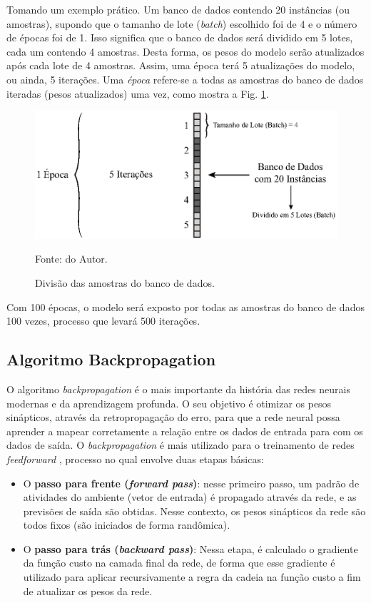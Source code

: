 Tomando um exemplo prático. Um banco de dados contendo 20 instâncias (ou amostras), supondo que o tamanho de lote (\textit{batch}) escolhido foi de 4 e o número de épocas foi de 1. Isso significa que o banco de dados será dividido em 5 lotes, cada um contendo 4 amostras. Desta forma, os pesos do modelo serão atualizados após cada lote de 4 amostras. Assim, uma época terá 5 atualizações do modelo, ou ainda, 5 iterações. Uma \textit{época} refere-se a todas as amostras do banco de dados iteradas (pesos atualizados) uma vez, como mostra a Fig. \ref{fig: BatchEpoch}.

\begin{figure}[H]
    \centering
    \includegraphics{04-Figuras/BatchEpoch.eps}
    \caption{Divisão das amostras do banco de dados.} \par
    Fonte: do Autor.
    \label{fig: BatchEpoch}
\end{figure}

Com 100 épocas, o modelo será exposto por todas as amostras do banco de dados 100 vezes, processo que levará 500 iterações.


\subsection{Algoritmo Backpropagation}

O algoritmo \textit{backpropagation} é o mais importante da história das redes neurais modernas e da aprendizagem profunda. O seu objetivo é otimizar os pesos sinápticos, através da retropropagação do erro, para que a rede neural possa aprender a mapear corretamente a relação entre os dados de entrada para com os dados de saída. O \textit{backpropagation} é mais utilizado para o treinamento de redes \textit{feedforward} \cite{haykin2007redes}, processo no qual envolve duas etapas básicas:

\begin{itemize}
    \item O \textbf{passo para frente (\textit{forward pass})}: nesse primeiro passo, um padrão de atividades do ambiente (vetor de entrada) é propagado através da rede, e as previsões de saída são obtidas. Nesse contexto, os pesos sinápticos da rede são todos fixos (são iniciados de forma randômica).
    \item O \textbf{passo para trás (\textit{backward pass})}: Nessa etapa, é calculado o gradiente da função custo na camada final da rede, de forma que esse gradiente é utilizado para aplicar recursivamente a regra da cadeia na função custo a fim de atualizar os pesos da rede.
\end{itemize}

